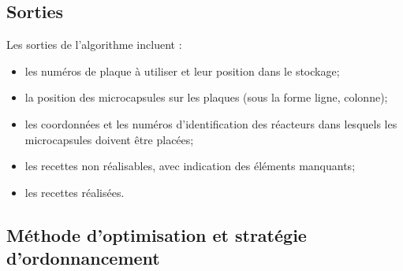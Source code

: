 \subsection*{Sorties}
Les sorties de l'algorithme incluent : 
\begin{itemize}
    \item les numéros de plaque à utiliser et leur position dans le stockage;
    \item la position des microcapsules sur les plaques (sous la forme \og{}ligne, colonne\fg{});
    \item les coordonnées et les numéros d'identification des réacteurs dans lesquels les microcapsules doivent être placées;
    \item les recettes non réalisables, avec indication des éléments manquants;
    \item les recettes réalisées.
\end{itemize}
\subsection{Méthode d'optimisation et stratégie d'ordonnancement}